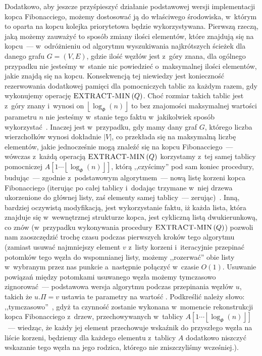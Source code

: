 Dodatkowo, aby jeszcze przyśpieszyć działanie podstawowej wersji implementacji kopca Fibonacciego, możemy dostosować ją do właściwego środowiska, w~którym to oparta na kopcu kolejka priorytetowa będzie wykorzystywana. Pierwszą rzeczą, jaką możemy zauważyć to sposób zmiany ilości elementów, które znajdują się na kopcu~--- w~odróżnieniu od algorytmu wyszukiwania najkrótszych ścieżek dla danego grafu $ G = \left( V, E \right)$, gdzie ilość węzłów jest z~góry znana, dla ogólnego przypadku nie jesteśmy w~stanie nic powiedzieć o~maksymalnej ilości elementów, jakie znajdą się na kopcu. Konsekwencją tej niewiedzy jest konieczność rezerwowania dodatkowej pamięci dla pomocniczych tablic za każdym razem, gdy wykonujemy operację $\textrm{\textsc{EXTRACT-MIN}} \left( Q \right)$. Choć rozmiar takich tablic jest z~góry znany i~wynosi on $ \left \lfloor \log_{\Phi} \left( n \right) \right \rfloor $ to bez znajomości maksymalnej wartości parametru $n$ nie jesteśmy w~stanie tego faktu w~jakikolwiek sposób wykorzystać~\cite[$19.4$]{Cormen}. Inaczej jest w~przypadku, gdy mamy dany graf $G$, którego liczba wierzchołków wynosi dokładnie $ \left| V \right|$, co przekłada się na maksymalną liczbę elementów, jakie jednocześnie mogą znaleźć się na kopcu Fibonacciego~--- wówczas z~każdą operacją $\textrm{\textsc{EXTRACT-MIN}} \left( Q \right)$ korzystamy z~tej samej tablicy pomocniczej $A \left[ 1 \cdots \left \lfloor \log_{\Phi} \left( n \right) \right \rfloor \right]$, którą ,,czyścimy'' pod sam koniec procedury, budując~--- zgodnie z~podstawowym algorytmem~--- nową listę korzeni kopca Fibonacciego (iterując po całej tablicy i~dodając trzymane w~niej drzewa ukorzenione do głównej listy, zaś elementy samej tablicy~--- zerując)~\cite[$523$--$524$]{Cormen}. Inną, bardziej oczywistą modyfikacją, jest wykorzystanie faktu, iż każda lista, która znajduje się w~wewnętrznej strukturze kopca, jest cykliczną listą dwukierunkową, co znów (w~przypadku wykonywania procedury $\textrm{\textsc{EXTRACT-MIN}} \left( Q \right)$) pozwoli nam zaoszczędzić trochę czasu podczas pierwszych kroków tego algorytmu (zamiast usuwać najmniejszy element $v$ z~listy korzeni i~iteracyjnie przepinać potomków tego węzła do wspomnianej listy, możemy ,,rozerwać'' obie listy w~wybranym przez nas punkcie a~następnie połączyć w~czasie $O \left( 1 \right)$. Usuwanie powiązań między potomkami usuwanego węzła możemy tymczasowo zignorować~--- podstawowa wersja algorytmu podczas przepinania węzłów $u$, takich że $ u.\Pi = v$ ustawia te parametry na wartość \KwNull. Podkreślić należy słowo: ,,tymczasowo''~, gdyż ta czynność zostanie wykonana w~momencie rekonstrukcji kopca Fibonacciego z~drzew, przechowywanych w~tablicy $A \left[ 1 \cdots \left \lfloor \log_{\Phi} \left( n \right) \right \rfloor \right]$~--- wiedząc, że każdy jej element przechowuje wskaźnik do przyszłego węzła na liście korzeni, będziemy dla każdego elementu z~tablicy $A$ dodatkowo niszczyć wskazanie tego węzła na jego rodzica, którego nie zniszczyliśmy wcześniej.).

